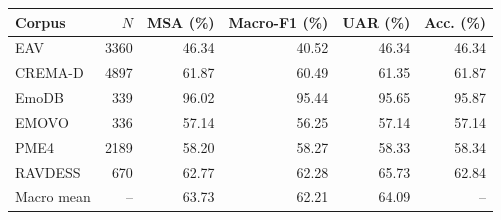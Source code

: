 \begin{tabular}{lrrrrr}
\hline
Corpus & $N$ & MSA (\%) & Macro-F1 (\%) & UAR (\%) & Acc. (\%) \\
\hline
EAV & 3360 & 46.34 & 40.52 & 46.34 & 46.34 \\
CREMA-D & 4897 & 61.87 & 60.49 & 61.35 & 61.87 \\
EmoDB & 339 & 96.02 & 95.44 & 95.65 & 95.87 \\
EMOVO & 336 & 57.14 & 56.25 & 57.14 & 57.14 \\
PME4 & 2189 & 58.20 & 58.27 & 58.33 & 58.34 \\
RAVDESS & 670 & 62.77 & 62.28 & 65.73 & 62.84 \\
\hline
Macro mean & -- & 63.73 & 62.21 & 64.09 & -- \\
\hline
\end{tabular}